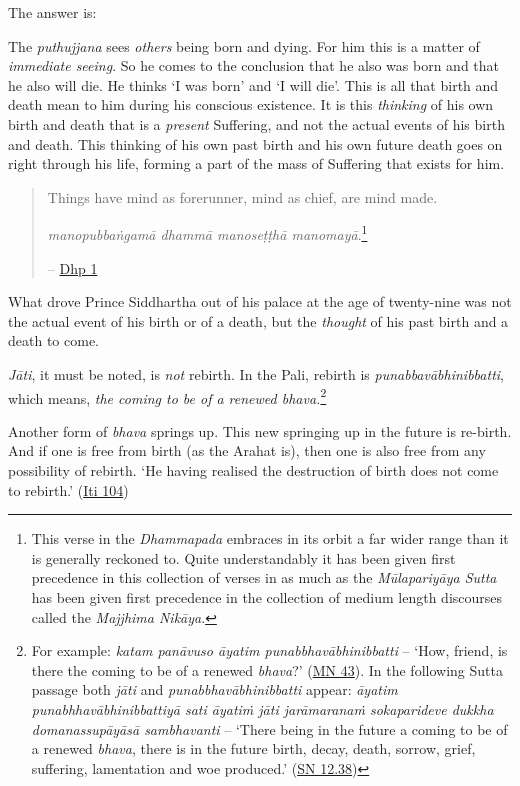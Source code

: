The answer is:

The \textit{puthujjana} sees \emph{others} being born and dying. For him this is a matter of \emph{immediate seeing}. So he comes to the conclusion that he also was born and that he also will die. He thinks `I was born' and `I will die'. This is all that birth and death mean to him during his conscious existence. It is this \emph{thinking} of his own birth and death that is a \emph{present} Suffering, and not the actual events of his birth and death. This thinking of his own past birth and his own future death goes on right through his life, forming a part of the mass of Suffering that exists for him.

\begin{quote}
Things have mind as forerunner, mind as chief, are mind made.

\textit{manopubbaṅgamā dhammā manoseṭṭhā manomayā}.\footnote{This verse in the \textit{Dhammapada} embraces in its orbit a far wider range than it is generally reckoned to. Quite understandably it has been given first precedence in this collection of verses in as much as the \textit{Mūlapariyāya Sutta} has been given first precedence in the collection of medium length discourses called the \textit{Majjhima Nikāya}.}

 -- \href{https://suttacentral.net/dhp1-20/en/anandajoti}{Dhp 1}
\end{quote}

What drove Prince Siddhartha out of his palace at the age of twenty-nine was not the actual event of his birth or of a death, but the \emph{thought} of his past birth and a death to come.

\textit{Jāti}, it must be noted, is \emph{not} rebirth. In the Pali, rebirth is \textit{punabbavābhinibbatti}, which means, \emph{the coming to be of a renewed bhava.}\footnote{For example: \textit{katam panāvuso āyatim punabbhavābhinibbatti} -- `How, friend, is there the coming to be of a renewed \textit{bhava}?' (\href{https://suttacentral.net/mn43/en/sujato}{MN 43}). In the following Sutta passage both \textit{jāti} and \textit{punabbhavābhinibbatti} appear: \textit{āyatim punabhhavābhinibbattiyā sati āyatiṁ jāti jarāmaranaṁ sokaparideve dukkha domanassupāyāsā sambhavanti} -- `There being in the future a coming to be of a renewed \textit{bhava}, there is in the future birth, decay, death, sorrow, grief, suffering, lamentation and woe produced.' (\href{https://suttacentral.net/sn12.38/en/bodhi}{SN 12.38})}

Another form of \textit{bhava} springs up. This new springing up in the future is re-birth. And if one is free from birth (as the Arahat is), then one is also free from any possibility of rebirth. `He having realised the destruction of birth does not come to rebirth.' (\href{https://suttacentral.net/iti104/en/sujato}{Iti 104})

